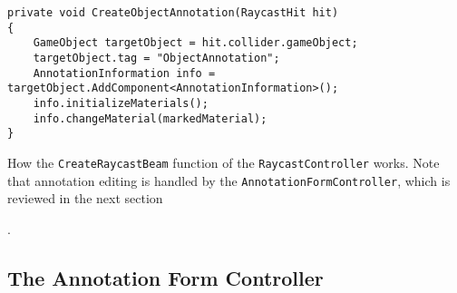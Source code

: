 \begin{table}
\begin{lstlisting}
private void CreateObjectAnnotation(RaycastHit hit)
{
    GameObject targetObject = hit.collider.gameObject;
    targetObject.tag = "ObjectAnnotation";
    AnnotationInformation info = targetObject.AddComponent<AnnotationInformation>();
    info.initializeMaterials();
    info.changeMaterial(markedMaterial);
}

\end{lstlisting}
\caption[How the \texttt{CreateRaycastBeam} function of the \texttt{RaycastController} works.]{How the \texttt{CreateRaycastBeam} function of the \texttt{RaycastController} works.
Note that annotation editing is handled by the \texttt{AnnotationFormController}, which is reviewed in the next section}. 
\end{table}




\subsection{The Annotation Form Controller}
